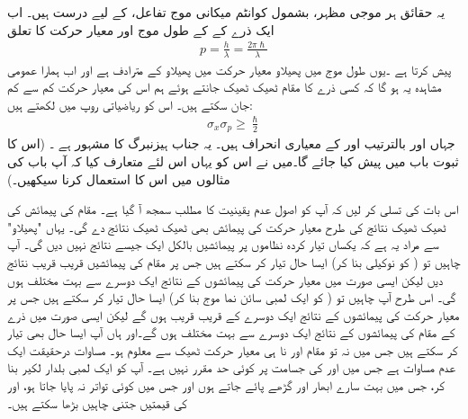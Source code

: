  یہ حقائق ہر موجی مظہر، بشمول کوانٹم میکانی موج تفاعل، کے لیے درست ہیں۔ اب ایک ذرے کے  کے طول موج اور  معیار حرکت کا تعلق  
\begin{align}
p=\frac{h}{\lambda}=\frac{2\pi\hslash}{\lambda}
\end{align}
پیش کرتا ہے ۔یوں طول موج میں پھیلاو معیار حرکت میں پھیلاو کے مترادف  ہے اور  اب ہمارا عمومی مشاہدہ  یہ  ہو گا کہ کسی ذرے کا مقام ٹھیک ٹھیک جانتے ہوئے ہم اس کی معیار حرکت  کم سے کم  جان سکتے ہیں۔ اس کو ریاضیاتی روپ میں لکھتے ہیں:
\begin{align}\label{مساوات_تفاعل_موج_اصول_عدم_یقینیت}
\sigma_{x}\sigma_{p}\ge\frac{\hslash}{2}
\end{align}
جہاں  اور  بالترتیب  اور  کے معیاری انحراف ہیں۔ یہ جناب ہیزنبرگ کا مشہور   ہے ۔ (اس کا ثبوت  باب  میں پیش کیا جائے گا۔میں نے اس کو یہاں اس لئے متعارف کیا کہ آپ باب  کی مثالوں میں اس کا استعمال کرنا سیکھیں۔)

 اس بات کی تسلی کر لیں کہ آپ کو اصول عدم یقینیت کا مطلب سمجھ آ گیا ہے۔  مقام کی پیمائش کی ٹھیک ٹھیک نتائج کی طرح معیار حرکت کی پیمائش بھی ٹھیک ٹھیک نتائج دے گی۔ یہاں  "پھیلاو" سے مراد یہ ہے کہ یکساں تیار کردہ  نظاموں پر پیمائشیں  بالکل ایک جیسے نتائج  نہیں دیں گی۔  آپ چاہیں تو ( کو نوکیلی بنا کر) ایسا حال تیار کر سکتے ہیں جس پر مقام کی پیمائشیں قریب قریب نتائج  دیں لیکن ایسی صورت میں معیار حرکت کی پیمائشوں کے نتائج ایک دوسرے سے بہت مختلف ہوں گی۔ اس طرح آپ چاہیں تو ( کو ایک لمبی سائن نما موج بنا کر) ایسا حال تیار کر سکتے ہیں جس پر معیار حرکت کی پیمائشوں کے نتائج ایک دوسرے کے قریب قریب ہوں گے لیکن ایسی صورت میں ذرے کے مقام کی پیمائشوں کے نتائج ایک دوسرے سے بہت مختلف ہوں گے۔اور ہاں آپ ایسا حال بھی تیار کر سکتے ہیں جس میں نہ تو مقام  اور نا ہی معیار حرکت ٹھیک سے معلوم ہو۔ مساوات  درحقیقت ایک عدم مساوات ہے جس میں  اور  کی جسامت پر کوئی حد مقرر نہیں ہے۔ آپ  کو ایک لمبی بلدار لکیر بنا کر، جس میں بہت سارے ابھار اور گڑھے پائے جاتے ہوں اور جس میں کوئی تواتر نہ پایا جاتا ہو،  اور  کی قیمتیں جتنی چاہیں بڑھا سکتے ہیں۔

